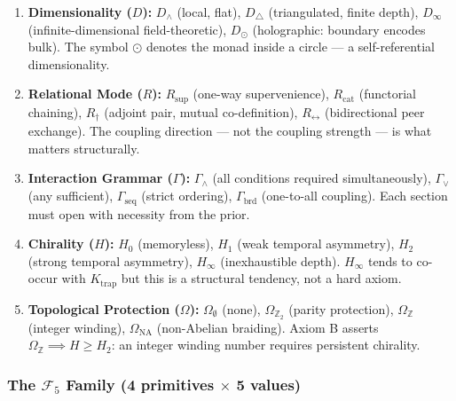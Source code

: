 \documentclass[12pt,a4paper]{article}
\begin{document}
\begin{enumerate}
    \item \textbf{Dimensionality ($D$):} $D_{\wedge}$ (local, flat), $D_{\triangle}$ (triangulated, finite depth), $D_{\infty}$ (infinite-dimensional field-theoretic), $D_{\odot}$ (holographic: boundary encodes bulk). The symbol $\odot$ denotes the monad inside a circle --- a self-referential dimensionality.
    \item \textbf{Relational Mode ($R$):} $R_\text{sup}$ (one-way supervenience), $R_\text{cat}$ (functorial chaining), $R_{\dagger}$ (adjoint pair, mutual co-definition), $R_{\leftrightarrow}$ (bidirectional peer exchange). The coupling direction --- not the coupling strength --- is what matters structurally.
    \item \textbf{Interaction Grammar ($\Gamma$):} $\Gamma_{\wedge}$ (all conditions required simultaneously), $\Gamma_{\vee}$ (any sufficient), $\Gamma_\text{seq}$ (strict ordering), $\Gamma_\text{brd}$ (one-to-all coupling). Each section must open with necessity from the prior.
    \item \textbf{Chirality ($H$):} $H_0$ (memoryless), $H_1$ (weak temporal asymmetry), $H_2$ (strong temporal asymmetry), $H_{\infty}$ (inexhaustible depth). $H_{\infty}$ tends to co-occur with $K_\text{trap}$ but this is a structural tendency, not a hard axiom.
    \item \textbf{Topological Protection ($\Omega$):} $\Omega_{\emptyset}$ (none), $\Omega_{\mathbb{Z}_2}$ (parity protection), $\Omega_\mathbb{Z}$ (integer winding), $\Omega_\text{NA}$ (non-Abelian braiding). Axiom B asserts $\Omega_\mathbb{Z} \implies H \geq H_2$: an integer winding number requires persistent chirality.
\end{enumerate}

\subsubsection{The $\mathcal{F}_5$ Family (4 primitives $\times$ 5 values)}
\end{document}
